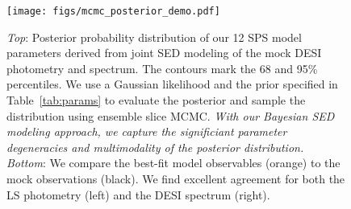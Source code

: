 \begin{figure}
\begin{center}
    \texttt{[image: figs/mcmc\_posterior\_demo.pdf]}
    \caption{
        \emph{Top}: 
        Posterior probability distribution of our 12 SPS model parameters
        derived from joint SED modeling of the mock DESI photometry and
        spectrum.
        The contours mark the 68 and 95\% percentiles.
        We use a Gaussian likelihood and the prior specified in
        Table~\ref{tab:params} to evaluate the posterior and sample the
        distribution using ensemble slice MCMC. 
        \emph{With our Bayesian SED modeling approach, we capture the significiant
        parameter degeneracies and multimodality of the posterior
        distribution.}\\
        \emph{Bottom}: 
        We compare the best-fit model observables (orange) to the mock
        observations (black).  
        We find excellent agreement for both the LS photometry (left) and the
        DESI spectrum (right). 
    } \label{fig:posterior}
\end{center}
\end{figure}


